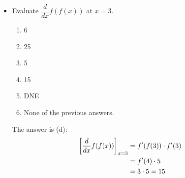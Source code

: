 \documentclass{ximera}
\begin{document}
\begin{problem}
\begin{itemize}
	  	\item Evaluate $\displaystyle\dfrac{d}{dx} f(f(x))$ at $x = 3$.
		  \begin{enumerate}
			    \item 6
			    \item 25
			    \item 5
			    \item 15
			    \item DNE
			    \item None of the previous answers.
			  \end{enumerate}
\begin{explanation}
			    The answer is (d):
			    \begin{align*}
			      \bigg[ \dfrac{d}{dx} f(f(x)) \bigg]_{x = 3} &= f'(f(3)) \cdot f'(3) \\
			      &= f'(4)\cdot 5 \\
			      &= 3 \cdot 5 = 15
			    \end{align*}
			  \end{explanation}
	\end{itemize}

\end{problem}
\end{document}
